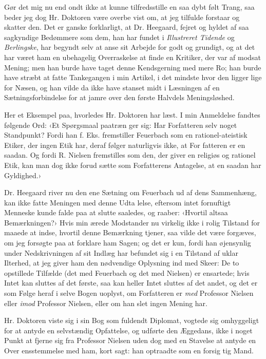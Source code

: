 \documentclass[12pt,a4paper,openany]{book}
\newcommand{\opage}[1]{\marginnote{\footnotesize\textit{[#1]}}}
\begin{document}
Gør det mig nu end ondt ikke at kunne tilfredsstille en saa
dybt følt Trang, saa beder jeg dog Hr. Doktoren være overbe\-%
vist om, at jeg tilfulde forstaar og skatter den. Det er ganske
forklarligt, at Dr. Heegaard, fejret og hyldet af saa sagkyndige
Bedømmere som dem, han har fundet i \emph{Illustreret Tidende} og
\emph{Berlingske}, har begyndt selv at anse sit Arbejde for godt og
grundigt, og at det har været ham en ubehagelig Overraskelse
at finde en Kritiker, der var af modsat Mening; men han burde
have taget denne Kendsgerning med mere Ro; han burde have
stræbt at fatte Tankegangen i min Artikel, i det mindste hvor
den ligger lige for Næsen, og han vilde da ikke have stanset
midt i Læsningen af en Sætningsforbindelse for at jamre over
den første Halvdels Meningsløshed.

\opage{35}Her et Eksempel paa, hvorledes Hr. Doktoren har læst. I
min Anmeldelse fandtes følgende Ord: ‹Et Spørgsmaal paatræn\-%
ger sig: Har Forfatteren selv noget Standpunkt? Fordi han
f. Eks. fremstiller Feuerbach som en rationel-ateistisk Etiker,
der ingen Etik har, deraf følger naturligvis ikke, at For\-%
fatteren er en saadan. Og fordi R. Nielsen fremstilles som den,
der giver en religiøs og rationel Etik, kan man dog ikke forud\-%
sætte som Forfatterens Antagelse, at en saadan har Gyldighed.›

Dr. Heegaard river nu den ene Sætning om Feuerbach ud af
dens Sammenhæng, kan ikke fatte Meningen med denne Udta\-%
lelse, eftersom intet fornuftigt Menneske kunde falde paa at
slutte saaledes, og raaber: ‹Hvortil altsaa Bemærkningen?› Hvis
min ærede Modstander nu virkelig ikke i rolig Tilstand for\-%
maaede at indse, hvortil denne Bemærkning tjener, saa vilde
det være forgæves, om jeg forsøgte paa at forklare ham Sagen;
og det er kun, fordi han øjensynlig under Nedskrivningen af
sit Indlæg har befundet sig i en Tilstand af uklar Ilterhed, at
jeg giver ham den nødvendige Oplysning ind med Skeer: De to
opstillede Tilfælde (det med Feuerbach og det med Nielsen) er
ensartede; hvis Intet kan sluttes af det første, saa kan heller
Intet sluttes af det andet, og det er som Følge heraf i selve
Bogen uoplyst, om Forfatteren er \emph{med} Professor Nielsen eller
\emph{imod} Professor Nielsen, eller om han slet ingen Mening har.

Hr. Doktoren viste sig i sin Bog som fuldendt Diplomat,
vogtede sig omhyggeligt for at antyde en selvstændig Opfattelse,
og udførte den Æggedans, ikke i noget Punkt at fjerne sig fra
Professor Nielsen uden dog med en Stavelse at antyde en Over\-%
ensstemmelse med ham, kort sagt: han optraadte som en forsig\-%
tig Mand.
\end{document}

